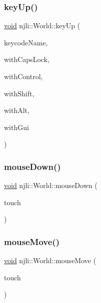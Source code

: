 \mbox{\label{classnjli_1_1_world_ad64c93b5f93db6e9df3ce7b9869d12d4}} 
\subsubsection{\texorpdfstring{key\+Up()}{keyUp()}}
{\footnotesize\ttfamily \mbox{\hyperlink{_thread_8h_af1e856da2e658414cb2456cb6f7ebc66}{void}} njli\+::\+World\+::key\+Up (\begin{DoxyParamCaption}\item[{const char $\ast$}]{keycode\+Name,  }\item[{bool}]{with\+Caps\+Lock,  }\item[{bool}]{with\+Control,  }\item[{bool}]{with\+Shift,  }\item[{bool}]{with\+Alt,  }\item[{bool}]{with\+Gui }\end{DoxyParamCaption})}

\mbox{\label{classnjli_1_1_world_a484e8c77cd1ed5613189c503326a310b}} 
\subsubsection{\texorpdfstring{mouse\+Down()}{mouseDown()}}
{\footnotesize\ttfamily \mbox{\hyperlink{_thread_8h_af1e856da2e658414cb2456cb6f7ebc66}{void}} njli\+::\+World\+::mouse\+Down (\begin{DoxyParamCaption}\item[{const \mbox{\hyperlink{classnjli_1_1_device_mouse}{Device\+Mouse}} \&}]{touch }\end{DoxyParamCaption})}

\mbox{\label{classnjli_1_1_world_a6c13bee0e9fca64f619dd92b927f948a}} 
\subsubsection{\texorpdfstring{mouse\+Move()}{mouseMove()}}
{\footnotesize\ttfamily \mbox{\hyperlink{_thread_8h_af1e856da2e658414cb2456cb6f7ebc66}{void}} njli\+::\+World\+::mouse\+Move (\begin{DoxyParamCaption}\item[{const \mbox{\hyperlink{classnjli_1_1_device_mouse}{Device\+Mouse}} \&}]{touch }\end{DoxyParamCaption})}


